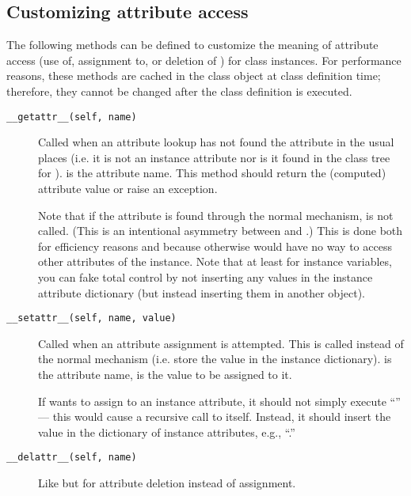 \subsection{Customizing attribute access\label{attribute-access}}

The following methods can be defined to customize the meaning of
attribute access (use of, assignment to, or deletion of )
for class instances.
For performance reasons, these methods are cached in the class object
at class definition time; therefore, they cannot be changed after the
class definition is executed.

\begin{description}

\item[{\tt __getattr__(self, name)}]
Called when an attribute lookup has not found the attribute in the
usual places (i.e. it is not an instance attribute nor is it found in
the class tree for ).   is the attribute name.
This method should return the (computed) attribute value or raise an
 exception.

Note that if the attribute is found through the normal mechanism,
 is not called.  (This is an intentional asymmetry between
 and .)
This is done both for efficiency reasons and because otherwise
 would have no way to access other attributes of the
instance.
Note that at least for instance variables, you can fake
total control by not inserting any values in the instance
attribute dictionary (but instead inserting them in another object).

\item[{\tt __setattr__(self, name, value)}]
Called when an attribute assignment is attempted.  This is called
instead of the normal mechanism (i.e. store the value in the instance
dictionary).   is the attribute name,  is the
value to be assigned to it.

If  wants to assign to an instance attribute, it
should not simply execute ``'' --- this would
cause a recursive call to itself.  Instead, it should insert the value in the
dictionary of instance attributes, e.g.,
``.''

\item[{\tt __delattr__(self, name)}]
Like  but for attribute deletion instead of
assignment.

\end{description}



